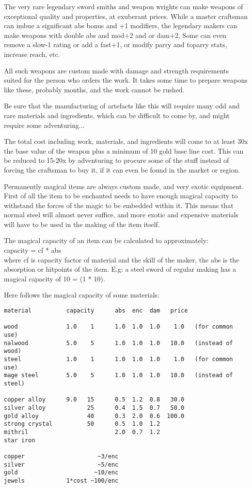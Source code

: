\normalsize

The very rare legendary sword smiths and weapon wrights can make weapons of exceptional quality and properties, at exuberant prices. While a master craftsman can imbue a significant abs bonus and +1 modifiers, the legendary makers can make weapons with double abs and mod+2 and or dam+2. Some can even remove a slow-1 rating or add a fast+1, or modify parry and toparry stats, increase reach, etc.

All such weapons are custom made with damage and strength requirements suited for the person who orders the work. It takes some time to prepare weapons like these, probably months, and the work cannot be rushed.

Be sure that the manufacturing of artefacts like this will require many odd and rare materials and ingredients, which can be difficult to come by, and might require some adventuring...

The total cost including work, materials, and ingredients will come to at least 30x the base value of the weapon plus a minimum of 10 gold base line cost. This can be reduced to 15-20x by adventuring to procure some of the stuff instead of forcing the craftsman to buy it, if it can even be found in the market or region.


Permanently magical items are always custom made, and very exotic equipment.
First of all the item to be enchanted needs to have enough magical capacity to withstand the forces of the magic to be embedded within it. This means that normal steel will almost never suffice, and more exotic and expensive materials will have to be used in the making of the item itself.

The magical capacity of an item can be calculated to approximately: \\
capacity = cf * abs \\
where cf is capacity factor of material and the skill of the maker, the abs is the absorption or hitpoints of the item.
E.g: a steel sword of regular making has a magical capacity of 10 = (1 * 10).

Here follows the magical capacity of some materials:

\small \begin{verbatim}
material          capacity      abs  enc  dam   price

wood              1.0    1      1.0  1.0  1.0    1.0   (for common use)
nalwood           5.0    5      1.0  1.0  1.0   10.0   (instead of wood)
steel             1.0    1      1.0  1.0  1.0    1.0   (for common use)
mage steel        5.0    5      1.0  1.0  1.0   10.0   (instead of steel)

copper alloy      9.0   15      0.5  1.2  0.8   30.0
silver alloy            25      0.4  1.5  0.7   50.0
gold alloy              40      0.3  2.0  0.6  100.0
strong crystal          50      0.5  1.0  1.2
mithril                         2.0  0.7  1.2
star iron

copper                     ~3/enc
silver                     ~5/enc
gold                      ~10/enc
jewels            1*cost ~100/enc

\end{verbatim} \normalsize

